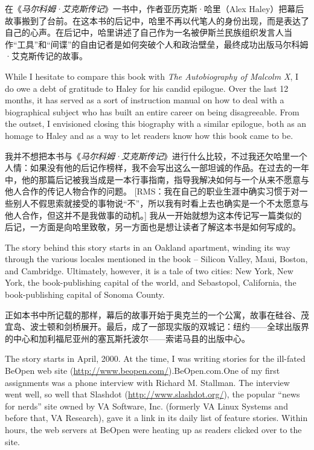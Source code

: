 \ifdefined\chs
在《\textit{马尔科姆·艾克斯传记}》一书中，作者亚历克斯·哈里（Alex Haley）把幕后故事搬到了台前。在这本书的后记中，哈里不再以代笔人的身份出现，而是表达了自己的心声。\ifdefined\spv 在后记中，哈里讲述了自己作为一名被伊斯兰民族组织发言人当作``工具''和``间谍''的自由记者是如何突破个人和政治壁垒，最终成功出版马尔科姆·艾克斯传记的故事。\fi
\fi

\ifdefined\eng
While I hesitate to compare this book with \textit{The Autobiography of Malcolm X}, I do owe a debt of gratitude to Haley for his candid epilogue. Over the last 12 months, it has served as a sort of instruction manual on how to deal with a biographical subject who has built an entire career on being disagreeable.
\ifdefined{}
\fi
From the outset, I envisioned closing this biography with a similar epilogue, both as an homage to Haley and as a way to let readers know how this book came to be.
\fi

\ifdefined\chs
我并不想把本书与《\textit{马尔科姆·艾克斯传记}》进行什么比较，不过我还欠哈里一个人情：如果没有他的后记作榜样，我不会写出这么一部坦诚的作品。在过去的一年中，他的那篇后记被我当成是一本行事指南，指导我解决如何与一个从来不愿意与他人合作的传记人物合作的问题。
\ifdefined\vtwo
[RMS：我在自己的职业生涯中确实习惯于对一些别人不假思索就接受的事物说``不''，所以我有时看上去也确实是一个不太愿意与他人合作，但这并不是我做事的动机。]
\fi
我从一开始就想为这本传记写一篇类似的后记，一方面是向哈里致敬，另一方面也是想让读者了解这本书是如何写成的。
\fi

\ifdefined\eng
The story behind this story starts in an Oakland apartment, winding its way through the various locales mentioned in the book -- Silicon Valley, Maui, Boston, and Cambridge. Ultimately, however, it is a tale of two cities: New York, New York, the book-publishing capital of the world, and Sebastopol, California, the book-publishing capital of Sonoma County.
\fi

\ifdefined\chs
正如本书中所记载的那样，幕后的故事开始于奥克兰的一个公寓，故事在硅谷、茂宜岛、波士顿和剑桥展开。最后，成了一部现实版的双城记：纽约——全球出版界的中心和加利福尼亚州的塞瓦斯托波尔——索诺马县的出版中心。
\fi

\ifdefined\eng
The story starts in April, 2000. At the time, I was writing stories for the ill-fated \ifdefined\vone BeOpen web site (\url{http://www.beopen.com/}).\fi\ifdefined\vtwo BeOpen.com.\fi One of my first assignments was a phone interview with Richard M. Stallman. The interview went well, so well that Slashdot (\url{http://www.slashdot.org/}), the popular ``news for nerds'' site owned by VA Software, Inc. (formerly VA Linux Systems and before that, VA Research), gave it a link in its daily list of feature stories. Within hours, the web servers at BeOpen were heating up as readers clicked over to the site.
\fi

